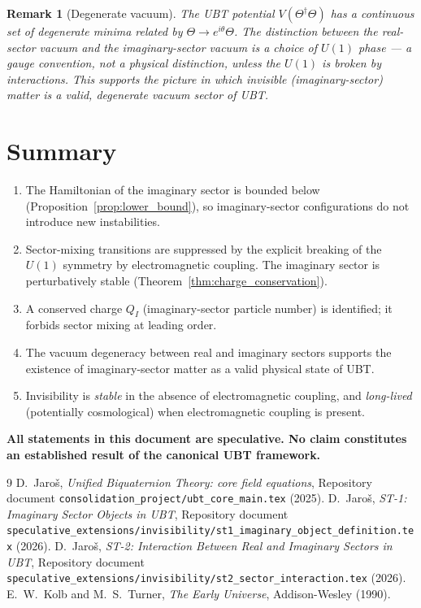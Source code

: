 \documentclass[12pt]{article}
\newtheorem{remark}{Remark}
\begin{document}
\begin{remark}[Degenerate vacuum]
The UBT potential $V(\Theta^\dagger\Theta)$ has a continuous set
of degenerate minima related by $\Theta \to e^{i\theta}\Theta$.
The distinction between the real-sector vacuum and the imaginary-sector
vacuum is a choice of $U(1)$ phase — a gauge convention, not a
physical distinction, unless the $U(1)$ is broken by interactions.
This supports the picture in which invisible (imaginary-sector)
matter is a valid, degenerate vacuum sector of UBT.
\end{remark}

\section{Summary}
\begin{enumerate}
  \item The Hamiltonian of the imaginary sector is bounded below
    (Proposition~\ref{prop:lower_bound}), so imaginary-sector
    configurations do not introduce new instabilities.
  \item Sector-mixing transitions are suppressed by the explicit
    breaking of the $U(1)$ symmetry by electromagnetic coupling.
    The imaginary sector is perturbatively stable
    (Theorem~\ref{thm:charge_conservation}).
  \item A conserved charge $Q_I$ (imaginary-sector particle number)
    is identified; it forbids sector mixing at leading order.
  \item The vacuum degeneracy between real and imaginary sectors
    supports the existence of imaginary-sector matter as a valid
    physical state of UBT.
  \item Invisibility is \emph{stable} in the absence of
    electromagnetic coupling, and \emph{long-lived} (potentially
    cosmological) when electromagnetic coupling is present.
\end{enumerate}

\medskip
\noindent\textbf{All statements in this document are speculative.
No claim constitutes an established result of the canonical UBT framework.}


\begin{thebibliography}{9}
  D.~Jaroš,
  \emph{Unified Biquaternion Theory: core field equations},
  Repository document \texttt{consolidation\_project/ubt\_core\_main.tex} (2025).
  D.~Jaroš,
  \emph{ST-1: Imaginary Sector Objects in UBT},
  Repository document
  \texttt{speculative\_extensions/invisibility/st1\_imaginary\_object\_definition.tex}
  (2026).
  D.~Jaroš,
  \emph{ST-2: Interaction Between Real and Imaginary Sectors in UBT},
  Repository document
  \texttt{speculative\_extensions/invisibility/st2\_sector\_interaction.tex}
  (2026).
  E.~W.~Kolb and M.~S.~Turner,
  \emph{The Early Universe},
  Addison-Wesley (1990).
\end{thebibliography}
\end{document}
